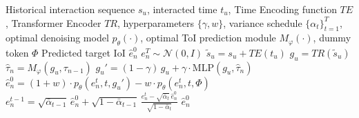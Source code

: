 \documentclass[sigconf,nonacm]{acmart}
\newcommand{\modelname}{PASRec}
\begin{document}
\begin{algorithm}[hbp]
\caption{Inference Algorithm of \modelname}
\label{alg:tagdiff_infer}
\begin{algorithmic}[1]
\Require Historical interaction sequence $s_u$, interacted time $t_u$, Time Encoding function $TE$, Transformer Encoder $TR$, hyperparameters $\{\gamma, w\}$, variance schedule $\{\alpha_t\}_{t=1}^T$, optimal denoising model $p_\theta(\cdot)$, optimal ToI prediction module $M_\varphi(\cdot)$, dummy token $\Phi$
\Ensure Predicted target IoI $\hat{e}_n^{0}$
\State $e_n^T \sim \mathcal{N}(0, I)$ 
\State $\tilde{s}_u = s_u + TE(t_u)$ 
\State $g_u = TR(\tilde{s}_u)$ 
\State $\hat\tau_{n} = M_\varphi(g_u, \tau_{n-1})$ 
\State $g_u' = (1 - \gamma)\,g_u + \gamma \cdot \mathrm{MLP}(g_u, \hat\tau_{n})$ 
    \State $\hat{e}_n^{0} = (1 + w) \cdot p_\theta(e_n^{t}, t, g_u') - w \cdot p_\theta(e_n^{t}, t, \Phi)$
    \State $e_n^{t-1} = \sqrt{\bar{\alpha}_{t-1}} \, \hat{e}_n^{0} 
        + \sqrt{1 - \bar{\alpha}_{t-1}} \, 
        \frac{e_n^{t} - \sqrt{\bar{\alpha}_t} \, \hat{e}_n^{0}}{\sqrt{1 - \bar{\alpha}_t}}$
\EndFor
\State \Return $\hat{e}_n^{0}$
\end{algorithmic}
\end{algorithm}
\end{document}
